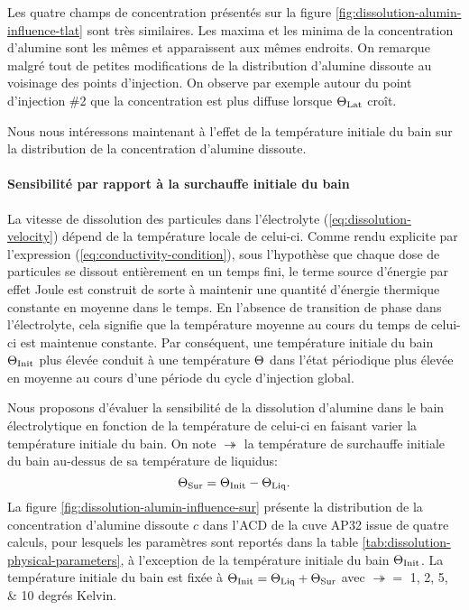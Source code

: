 Les quatre champs de concentration présentés sur la figure
\ref{fig:dissolution-alumin-influence-tlat} sont très similaires. Les
maxima et les minima de la concentration d'alumine
sont les mêmes et apparaissent aux mêmes endroits. On remarque
malgré tout de petites modifications de la distribution d'alumine
dissoute au voisinage des points d'injection. On observe par exemple
autour du point d'injection \#2 que la concentration est plus diffuse
lorsque $\Theta_\text{Lat}$ croît.

Nous nous intéressons maintenant à l'effet de la température
initiale du bain sur la distribution de la concentration d'alumine dissoute.

\paragraph{Sensibilité par rapport à la surchauffe initiale du bain}
La vitesse de dissolution des particules dans l'électrolyte
(\ref{eq:dissolution-velocity}) dépend de la température locale de
celui-ci. Comme rendu explicite par l'expression
(\ref{eq:conductivity-condition}), sous l'hypothèse que chaque dose de
particules se dissout entièrement en un temps fini, le terme source
d'énergie par effet Joule est construit de sorte à maintenir une
quantité d'énergie thermique constante en moyenne dans le temps. En
l'absence de transition de phase dans l'électrolyte, cela signifie que
la température moyenne au cours du temps de celui-ci est maintenue
constante. Par conséquent, une température initiale du bain $\Theta_\text{Init}$
plus élevée conduit à une température $\Theta$ dans l'état
périodique plus élevée en moyenne au cours d'une période
du cycle d'injection global.



Nous proposons d'évaluer la sensibilité de la dissolution d'alumine
dans le bain électrolytique en fonction de la température de celui-ci
en faisant varier la température initiale du bain. On note $\tsur$ la
température de surchauffe initiale du bain au-dessus de sa température de
liquidus:
\begin{equation}
  \Theta_\text{Sur} = \Theta_\text{Init} - \Theta_\text{Liq}.
\end{equation}
La figure \ref{fig:dissolution-alumin-influence-sur} présente la distribution
de la concentration d'alumine dissoute $c$ dans l'ACD de la cuve AP32
issue de quatre calculs, pour lesquels les paramètres sont reportés
dans la table \ref{tab:dissolution-physical-parameters}, à
l'exception de la température initiale du bain $\Theta_\text{Init}$. La
température initiale du bain est fixée à $\Theta_\text{Init} = \Theta_\text{Liq} + \Theta_\text{Sur}$ avec $\tsur = $ \numlist{1;2;5;10} degrés Kelvin.

